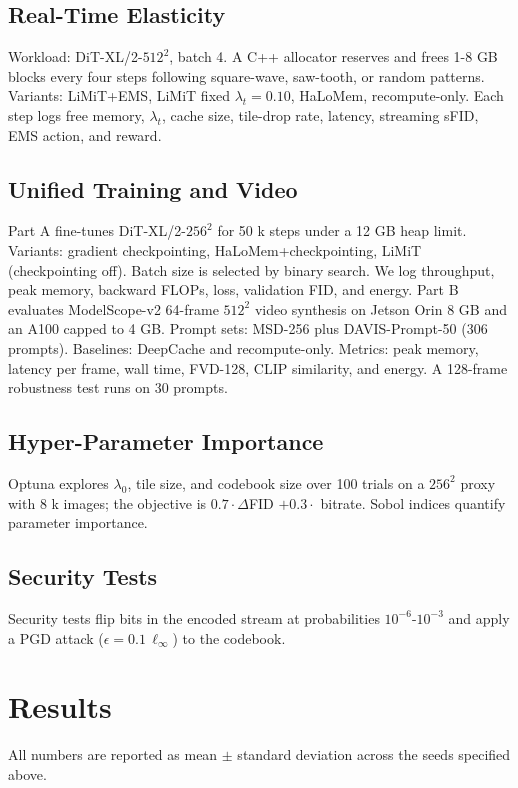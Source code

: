 \documentclass{article}
\begin{document}
\subsection{Real-Time Elasticity}
Workload: DiT-XL/2-$512^2$, batch 4. A C++ allocator reserves and frees 1-8 GB blocks every four steps following square-wave, saw-tooth, or random patterns. Variants: LiMiT+EMS, LiMiT fixed $\lambda_t = 0.10$, HaLoMem, recompute-only. Each step logs free memory, $\lambda_t$, cache size, tile-drop rate, latency, streaming sFID, EMS action, and reward.

\subsection{Unified Training and Video}
Part A fine-tunes DiT-XL/2-$256^2$ for 50 k steps under a 12 GB heap limit. Variants: gradient checkpointing, HaLoMem+checkpointing, LiMiT (checkpointing off). Batch size is selected by binary search. We log throughput, peak memory, backward FLOPs, loss, validation FID, and energy. Part B evaluates ModelScope-v2 64-frame $512^2$ video synthesis on Jetson Orin 8 GB and an A100 capped to 4 GB. Prompt sets: MSD-256 plus DAVIS-Prompt-50 (306 prompts). Baselines: DeepCache and recompute-only. Metrics: peak memory, latency per frame, wall time, FVD-128, CLIP similarity, and energy. A 128-frame robustness test runs on 30 prompts.

\subsection{Hyper-Parameter Importance}
Optuna explores $\lambda_0$, tile size, and codebook size over 100 trials on a $256^2$ proxy with 8 k images; the objective is $0.7\cdot\Delta$FID $+ 0.3\cdot$ bitrate. Sobol indices quantify parameter importance.

\subsection{Security Tests}
Security tests flip bits in the encoded stream at probabilities $10^{-6}$-$10^{-3}$ and apply a PGD attack ($\epsilon = 0.1\,\ell_{\infty}$) to the codebook.

\section{Results}
All numbers are reported as mean $\pm$ standard deviation across the seeds specified above.
\end{document}
